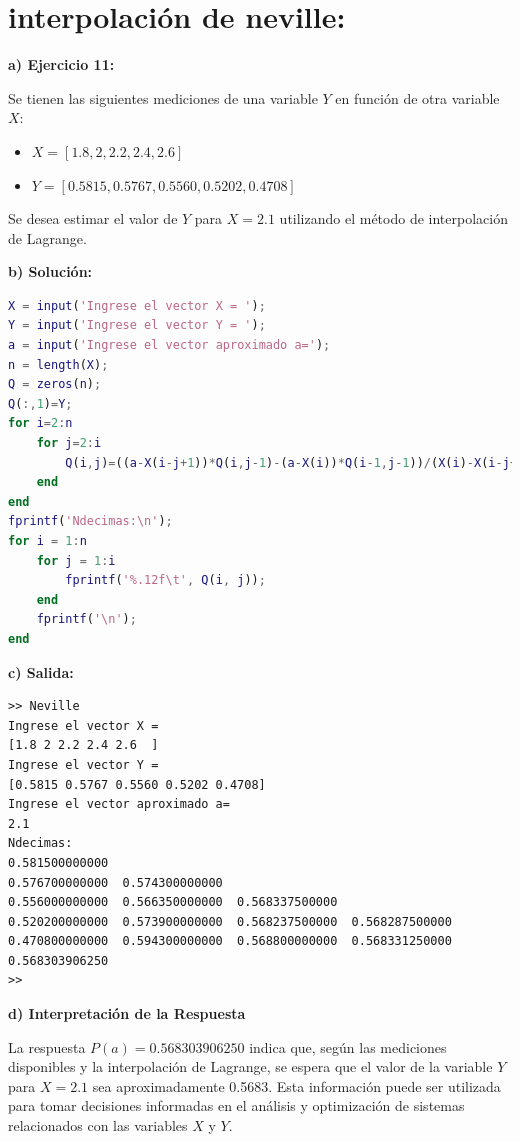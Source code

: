 \documentclass[12pt,a4paper,twoside]{article}  %
\begin{document}
\section{interpolación de neville: }


\textbf{a) Ejercicio 11: }

Se tienen las siguientes mediciones de una variable \(Y\) en función de otra variable \(X\):

\begin{itemize}
    \item \(X = [1.8,2 ,2.2, 2.4 ,2.6  ]\)
    \item \(Y = [0.5815, 0.5767, 0.5560 ,0.5202, 0.4708]\)
\end{itemize}

Se desea estimar el valor de \(Y\) para \(X = 2.1\) utilizando el método de interpolación de Lagrange.

\textbf{b) Solución:}
\begin{lstlisting}[language=Matlab]
X = input('Ingrese el vector X = ');
Y = input('Ingrese el vector Y = ');
a = input('Ingrese el vector aproximado a=');
n = length(X);
Q = zeros(n);
Q(:,1)=Y;
for i=2:n
    for j=2:i
        Q(i,j)=((a-X(i-j+1))*Q(i,j-1)-(a-X(i))*Q(i-1,j-1))/(X(i)-X(i-j+1));
    end
end
fprintf('Ndecimas:\n');
for i = 1:n
    for j = 1:i
        fprintf('%.12f\t', Q(i, j));
    end
    fprintf('\n');
end

\end{lstlisting}

\textbf{c) Salida:}

\begin{verbatim}
>> Neville
Ingrese el vector X = 
[1.8 2 2.2 2.4 2.6  ]
Ingrese el vector Y = 
[0.5815 0.5767 0.5560 0.5202 0.4708]
Ingrese el vector aproximado a=
2.1
Ndecimas:
0.581500000000	
0.576700000000	0.574300000000	
0.556000000000	0.566350000000	0.568337500000	
0.520200000000	0.573900000000	0.568237500000	0.568287500000	
0.470800000000	0.594300000000	0.568800000000	0.568331250000	0.568303906250	
>> 
\end{verbatim}

\textbf{d) Interpretación de la Respuesta}

La respuesta \(P(a) = 0.568303906250\) indica que, según las mediciones disponibles y la interpolación de Lagrange, se espera que el valor de la variable \(Y\) para \(X = 2.1\) sea aproximadamente 0.5683. Esta información puede ser utilizada para tomar decisiones informadas en el análisis y optimización de sistemas relacionados con las variables \(X\) y \(Y\).
\end{document}
